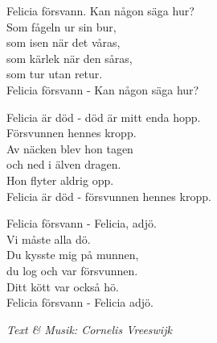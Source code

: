 \vspace{10pt}
Felicia försvann. Kan någon säga hur?\\
Som fågeln ur sin bur,\\
som isen när det våras,\\
som kärlek när den såras,\\
som tur utan retur.\\
Felicia försvann - Kan någon säga hur?\par
\vspace{10pt}
Felicia är död - död är mitt enda hopp.\\
Försvunnen hennes kropp.\\
Av näcken blev hon tagen\\
och ned i älven dragen.\\
Hon flyter aldrig opp.\\
Felicia är död - försvunnen hennes kropp.\par
\vspace{10pt}
Felicia försvann - Felicia, adjö.\\
Vi måste alla dö.\\
Du kysste mig på munnen,\\
du log och var försvunnen.\\
Ditt kött var också hö.\\
Felicia försvann - Felicia adjö.\par
\vspace{10pt}
{\footnotesize\textit{Text \& Musik: Cornelis Vreeswijk}}
